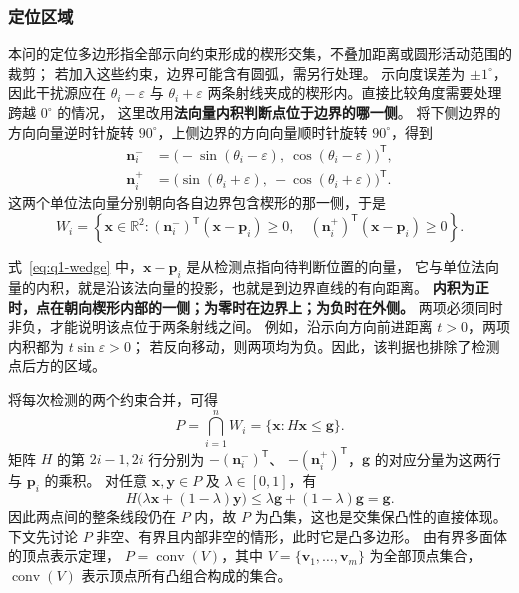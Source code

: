 \documentclass[UTF8,a4paper,12pt]{ctexart}
\begin{document}
\subsubsection{定位区域}
\label{sec:q1-wedge}




本问的定位多边形指全部示向约束形成的楔形交集，不叠加距离或圆形活动范围的裁剪；
若加入这些约束，边界可能含有圆弧，需另行处理。
示向度误差为 $\pm1^\circ$，因此干扰源应在 $\theta_i-\varepsilon$ 与
$\theta_i+\varepsilon$ 两条射线夹成的楔形内。直接比较角度需要处理跨越 $0^\circ$ 的情况，
这里改用\textbf{法向量内积判断点位于边界的哪一侧}。
将下侧边界的方向向量逆时针旋转 $90^\circ$，上侧边界的方向向量顺时针旋转 $90^\circ$，得到
\[
  \begin{aligned}
    \boldsymbol n_i^-&=\bigl(-\sin(\theta_i-\varepsilon),\ \cos(\theta_i-\varepsilon)\bigr)^{\mathsf T},\\
    \boldsymbol n_i^+&=\bigl(\sin(\theta_i+\varepsilon),\ -\cos(\theta_i+\varepsilon)\bigr)^{\mathsf T}.
  \end{aligned}
\]
这两个单位法向量分别朝向各自边界包含楔形的那一侧，于是
\begin{equation}
  W_i=\left\{\boldsymbol x\in\mathbb R^2:
  (\boldsymbol n_i^-)^{\mathsf T}(\boldsymbol x-\boldsymbol p_i)\geq0,\quad
  (\boldsymbol n_i^+)^{\mathsf T}(\boldsymbol x-\boldsymbol p_i)\geq0\right\}.
  \label{eq:q1-wedge}
\end{equation}


式~\eqref{eq:q1-wedge} 中，$\boldsymbol x-\boldsymbol p_i$ 是从检测点指向待判断位置的向量，
它与单位法向量的内积，就是沿该法向量的投影，也就是到边界直线的有向距离。
\textbf{内积为正时，点在朝向楔形内部的一侧；为零时在边界上；为负时在外侧。}
两项必须同时非负，才能说明该点位于两条射线之间。
例如，沿示向方向前进距离 $t>0$，两项内积都为 $t\sin\varepsilon>0$；
若反向移动，则两项均为负。因此，该判据也排除了检测点后方的区域。




将每次检测的两个约束合并，可得
\begin{equation}
  P=\bigcap_{i=1}^{n}W_i=\{\boldsymbol x:H\boldsymbol x\leq\boldsymbol g\}.
  \label{eq:q1-intersection}
\end{equation}
矩阵 $H$ 的第 $2i-1,2i$ 行分别为 $-(\boldsymbol n_i^-)^{\mathsf T}$、
$-(\boldsymbol n_i^+)^{\mathsf T}$，$\boldsymbol g$ 的对应分量为这两行与 $\boldsymbol p_i$ 的乘积。
对任意 $\boldsymbol x,\boldsymbol y\in P$ 及 $\lambda\in[0,1]$，有
\[
  H\bigl(\lambda\boldsymbol x+(1-\lambda)\boldsymbol y\bigr)
  \leq\lambda\boldsymbol g+(1-\lambda)\boldsymbol g=\boldsymbol g.
\]
因此两点间的整条线段仍在 $P$ 内，故 $P$ 为凸集，这也是交集保凸性的直接体现。
下文先讨论 $P$ 非空、有界且内部非空的情形，此时它是凸多边形。
由有界多面体的顶点表示定理\cite{boyd2004convex}，
$P=\operatorname{conv}(V)$，其中 $V=\{\boldsymbol v_1,\ldots,\boldsymbol v_m\}$ 为全部顶点集合，
$\operatorname{conv}(V)$ 表示顶点所有凸组合构成的集合。
\end{document}
